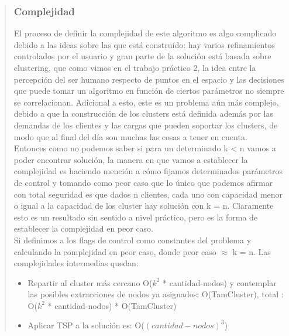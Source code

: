 \documentclass[11pt,a4paper]{article}
\begin{document}
\begin{verse}
\subsubsection{Complejidad}
El proceso de definir la complejidad de este algoritmo es algo complicado debido a las ideas sobre las que está construído: hay varios refinamientos controlados por el usuario y gran parte de la solución está basada sobre clustering, que como vimos en el trabajo práctico 2, la idea entre la percepción del ser humano respecto de puntos en el espacio y las decisiones que puede tomar un algoritmo en función de ciertos parámetros no siempre se correlacionan. Adicional a esto, este es un problema aún más complejo, debido a que la construcción de los clusters está definida además por las demandas de los clientes y las cargas que pueden soportar los clusters, de modo que al final del día son muchas las cosas a tener en cuenta.\\ Entonces como no podemos saber si para un determinado k < n vamos a poder encontrar solución, la manera en que vamos a establecer la complejidad es haciendo mención a cómo fijamos determinados parámetros de control y tomando como peor caso que lo único que podemos afirmar con total seguridad es que dados n clientes, cada uno con capacidad menor o igual a la capacidad de los cluster hay solución con k = n. Claramente esto es un resultado sin sentido a nivel práctico, pero es la forma de establecer la complejidad en peor caso.\\ 

Si definimos a los flags de control como constantes del problema y calculando la complejidad en peor caso, donde peor caso $\approx$ k = n.  
Las complejidades intermedias quedan: 
\begin{itemize}
\item Repartir al cluster más cercano O($k^{2}$ * cantidad-nodos) y contemplar las posibles extracciones de nodos ya asignados: O(TamCluster), total : O($k^{2}$ * cantidad-nodos) * O(TamCluster)
\item Aplicar TSP a la solución es: O($(cantidad-nodos)^{3}$)
\end{itemize}


\end{verse}
\end{document}
